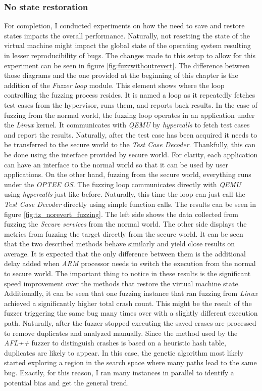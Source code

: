 \subsubsection{No state restoration}
For completion, I conducted experiments on how the need to save and restore states impacts the overall performance. Naturally, not resetting the state of the virtual machine might impact the global state of the operating system resulting in lesser reproducibility of bugs. 
The changes made to this setup to allow for this experiment can be seen in figure \ref{fig:fuzzwithoutrevert}. The difference between those diagrams and the one provided at the beginning of this chapter is the addition of the \textit{Fuzzer loop} module. This element shows where the loop controlling the fuzzing process resides. It is named a loop as it repeatedly fetches test cases from the hypervisor, runs them, and reports back results. In the case of fuzzing from the normal world, the fuzzing loop operates in an application under the \textit{Linux} kernel. It communicates with \textit{QEMU} by \textit{hypercalls} to fetch test cases and report the results. Naturally, after the test case has been acquired it needs to be transferred to the secure world to the \textit{Test Case Decoder}. Thankfully, this can be done using the interface provided by secure world. For clarity, each application can have an interface to the normal world so that it can be used by user applications. On the other hand, fuzzing from the secure world, everything runs under the \textit{OPTEE OS}. The fuzzing loop communicates directly with \textit{QEMU} using \textit{hypercalls} just like before. Naturally, this time the loop can just call the \textit{Test Case Decoder} directly using simple function calls. The results can be seen in figure \ref{fig:tz_norevert_fuzzing}. The left side shows the data collected from fuzzing the \textit{Secure services} from the normal world. The other side displays the metrics from fuzzing the target directly from the secure world. It can be seen that the two described methods behave similarly and yield close results on average. It is expected that the only difference between them is the additional delay added when \textit{ARM} processor needs to switch the execution from the normal to secure world. The important thing to notice in these results is the significant speed improvement over the methods that restore the virtual machine state. Additionally, it can be seen that one fuzzing instance that ran fuzzing from \textit{Linux} achieved a significantly higher total crash count. This might be the result of the fuzzer triggering the same bug many times over with a slightly different execution path. Naturally, after the fuzzer stopped executing the saved crases are processed to remove duplicates and analyzed manually. Since the method used by the \textit{AFL++} fuzzer to distinguish crashes is based on a heuristic hash table, duplicates are likely to appear. In this case, the genetic algorithm most likely started exploring a region in the search space where many paths lead to the same bug. Exactly, for this reason, I ran many instances in parallel to identify a potential bias and get the general trend.

